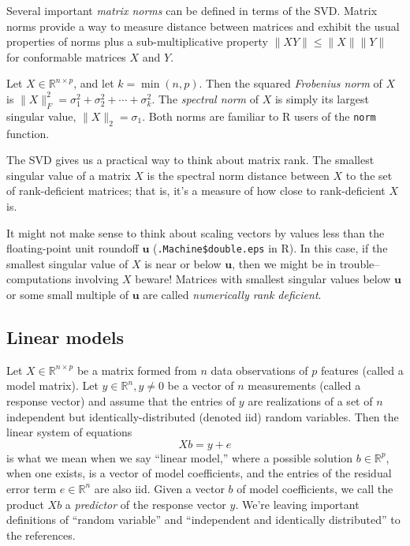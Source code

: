 \documentclass[10pt]{article} %
\newcommand{\R}{{\mathbb R}}
\begin{document}
Several important {\it matrix norms} can be defined in terms of the SVD.
Matrix norms provide a way to measure distance between matrices and exhibit
the usual properties of norms plus a sub-multiplicative property
$\|X Y\| \le \|X\| \|Y\|$ for conformable matrices $X$ and $Y$.

Let $X\in\R^{n\times p}$, and let $k=\min(n, p)$. Then the squared
{\it Frobenius norm} of $X$ is
$\|X\|_F^2 = \sigma_1^2 + \sigma_2^2 + \cdots + \sigma_k^2$.
The {\it spectral norm} of $X$ is simply its largest singular value,
$\|X\|_2 = \sigma_1$. Both norms are familiar to R users of the
{\tt norm} function.



The SVD gives us a practical way to think about matrix rank.  The smallest
singular value of a matrix $X$ is the spectral norm distance between $X$ to the
set of rank-deficient matrices; that is, it's a measure of how close to
rank-deficient $X$ is.

It might not make sense to think about scaling vectors by values less than the
floating-point unit roundoff $\mathbf{u}$ ({\tt .Machine\$double.eps} in R). In
this case, if the smallest singular value of $X$ is near or below $\mathbf{u}$,
then we might be in trouble--computations involving $X$ beware!  Matrices with
smallest singular values below $\mathbf{u}$ or some small multiple of
$\mathbf{u}$  are called {\it numerically rank deficient}.



\subsection*{Linear models}

Let $X\in\R^{n\times p}$ be a matrix formed from $n$ data observations of $p$
features (called a model matrix).  Let $y\in\R^n, y\ne 0$ be a vector of $n$
measurements (called a response vector) and assume that the entries of $y$
are realizations of a set of $n$ independent but identically-distributed
(denoted iid) random variables.  Then the linear system of equations
\begin{equation}\label{linear}
Xb = y + e
\end{equation}
is what we mean when we say ``linear model,'' where a possible solution
$b\in\R^p$, when one exists, is a vector of model coefficients, and the
entries of the residual error term $e\in\R^n$ are also iid.
Given a vector $b$ of model
coefficients, we call the product $Xb$ a {\it predictor} of the response vector
$y$.  We're leaving important definitions of ``random variable'' and
``independent and identically distributed'' to the references.
\end{document}

